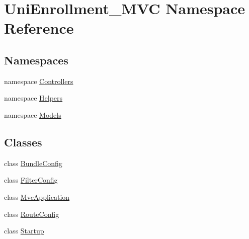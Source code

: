 \hypertarget{namespace_uni_enrollment___m_v_c}{}\section{Uni\+Enrollment\+\_\+\+M\+VC Namespace Reference}
\label{namespace_uni_enrollment___m_v_c}
\subsection*{Namespaces}
\begin{DoxyCompactItemize}
\item 
namespace \hyperlink{namespace_uni_enrollment___m_v_c_1_1_controllers}{Controllers}
\item 
namespace \hyperlink{namespace_uni_enrollment___m_v_c_1_1_helpers}{Helpers}
\item 
namespace \hyperlink{namespace_uni_enrollment___m_v_c_1_1_models}{Models}
\end{DoxyCompactItemize}
\subsection*{Classes}
\begin{DoxyCompactItemize}
\item 
class \hyperlink{class_uni_enrollment___m_v_c_1_1_bundle_config}{Bundle\+Config}
\item 
class \hyperlink{class_uni_enrollment___m_v_c_1_1_filter_config}{Filter\+Config}
\item 
class \hyperlink{class_uni_enrollment___m_v_c_1_1_mvc_application}{Mvc\+Application}
\item 
class \hyperlink{class_uni_enrollment___m_v_c_1_1_route_config}{Route\+Config}
\item 
class \hyperlink{class_uni_enrollment___m_v_c_1_1_startup}{Startup}
\end{DoxyCompactItemize}
